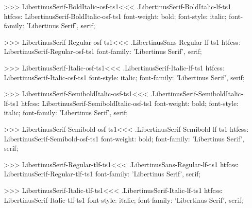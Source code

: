 {{{{>>>
\<LibertinusSerif-BoldItalic-osf-ts1\><<<
.LibertinusSerif-BoldItalic-lf-ts1
htfcss:  LibertinusSerif-BoldItalic-osf-ts1  font-weight: bold; font-style: italic; font-family: 'Libertinus Serif', serif;

>>>
\<LibertinusSerif-Regular-osf-ts1\><<<
.LibertinusSans-Regular-lf-ts1
htfcss:  LibertinusSerif-Regular-osf-ts1  font-family: 'Libertinus Serif', serif;

>>>
\<LibertinusSerif-Italic-osf-ts1\><<<
.LibertinusSerif-Italic-lf-ts1
htfcss:  LibertinusSerif-Italic-osf-ts1  font-style: italic; font-family: 'Libertinus Serif', serif;

>>>
\<LibertinusSerif-SemiboldItalic-osf-ts1\><<<
.LibertinusSerif-SemiboldItalic-lf-ts1
htfcss:  LibertinusSerif-SemiboldItalic-osf-ts1  font-weight: bold; font-style: italic; font-family: 'Libertinus Serif', serif;

>>>
\<LibertinusSerif-Semibold-osf-ts1\><<<
.LibertinusSerif-Semibold-lf-ts1
htfcss:  LibertinusSerif-Semibold-osf-ts1  font-weight: bold; font-family: 'Libertinus Serif', serif;

>>>
\<LibertinusSerif-Regular-tlf-ts1\><<<
.LibertinusSans-Regular-lf-ts1
htfcss:  LibertinusSerif-Regular-tlf-ts1  font-family: 'Libertinus Serif', serif;

>>>
\<LibertinusSerif-Italic-tlf-ts1\><<<
.LibertinusSerif-Italic-lf-ts1
htfcss:  LibertinusSerif-Italic-tlf-ts1  font-style: italic; font-family: 'Libertinus Serif', serif;

}}}}
